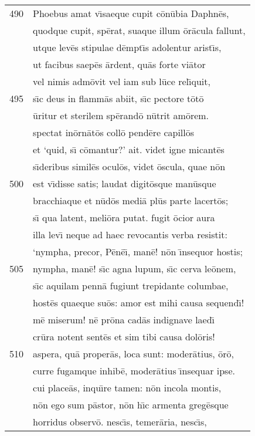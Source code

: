 \documentclass[paper=6in:9in,pagesize=pdftex,
               headinclude=on,footinclude=on,12pt]{scrbook}
\begin{document}
\begin{longtable}[p]{ r l }
490 & Phoebus amat v\={\i}saeque cupit c\=on\=ubia Daphn\=es,\\ 
 & quodque cupit, sp\=erat, suaque illum \=or\=acula fallunt,\\ 
 & utque lev\=es stipulae d\=empt\={\i}s adolentur arist\={\i}s,\\ 
 & ut facibus saep\=es \=ardent, qu\=as forte vi\=ator\\ 
 & vel nimis adm\=ovit vel iam sub l\=uce rel\={\i}quit,\\ 
495 & s\={\i}c deus in flamm\=as abiit, s\={\i}c pectore t\=ot\=o\\ 
 & \=uritur et sterilem sp\=erand\=o n\=utrit am\=orem.\\ 
 & spectat in\=orn\=at\=os coll\=o pend\=ere capill\=os\\ 
 & et `quid, s\={\i} c\=omantur?' ait. videt igne micant\=es\\ 
 & s\={\i}deribus simil\=es ocul\=os, videt \=oscula, quae n\=on\\ 
500 & est v\={\i}disse satis; laudat digit\=osque man\=usque\\ 
 & bracchiaque et n\=ud\=os medi\=a pl\=us parte lacert\=os;\\ 
 & s\={\i} qua latent, meli\=ora putat. fugit \=ocior aura\\ 
 & illa lev\={\i} neque ad haec revocantis verba resistit:\\ 
 & `nympha, precor, P\=en\=e\={\i}, man\=e! n\=on \={\i}nsequor hostis;\\ 
505 & nympha, man\=e! s\={\i}c agna lupum, s\={\i}c cerva le\=onem,\\ 
 & s\={\i}c aquilam penn\=a fugiunt trepidante columbae,\\ 
 & host\=es quaeque su\=os: amor est mihi causa sequend\={\i}!\\ 
 & m\=e miserum! n\=e pr\=ona cad\=as indignave laed\={\i}\\ 
 & cr\=ura notent sent\=es et sim tibi causa dol\=oris!\\ 
510 & aspera, qu\=a proper\=as, loca sunt: moder\=atius, \=or\=o,\\ 
 & curre fugamque inhib\=e, moder\=atius \={\i}nsequar ipse.\\ 
 & cui place\=as, inqu\={\i}re tamen: n\=on incola montis,\\ 
 & n\=on ego sum p\=astor, n\=on h\={\i}c armenta greg\=esque\\ 
 & horridus observ\=o. nesc\={\i}s, temer\=aria, nesc\={\i}s,\\ 

\end{longtable}
\end{document}
